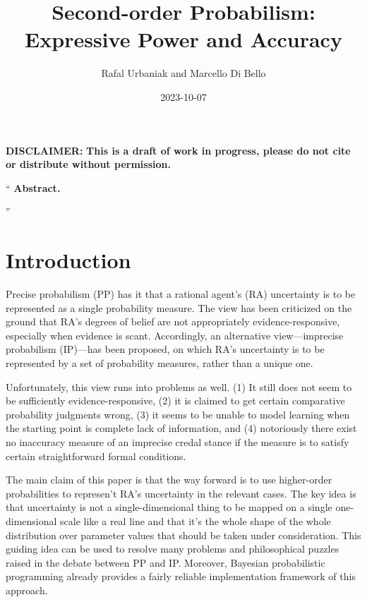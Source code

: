 \documentclass[
  10pt,
  dvipsnames,enabledeprecatedfontcommands]{scrartcl}
\title{Second-order Probabilism: Expressive Power and Accuracy}
\author{Rafal Urbaniak and Marcello Di Bello}
\date{2023-10-07}
\renewenvironment{quote}
{\list{}{\leftmargin=1em\rightmargin=1em}\item[]``}
{''\endlist}
\begin{document}
\maketitle

{
\hypersetup{linkcolor=}
\setcounter{tocdepth}{2}
\tableofcontents
}
\vspace{2cm}

\noindent \textbf{DISCLAIMER:}
\textbf{This is a draft of work in progress, please do not cite or distribute without permission.}

\thispagestyle{empty}

\newpage

\begin{quote} \textbf{Abstract.}  

\end{quote}

\hypertarget{introduction}{%
\section{Introduction}\label{introduction}}

\label{sec:introduction}

Precise probabilism (PP) has it that a rational agent's (RA) uncertainty
is to be represented as a single probability measure. The view has been
criticized on the ground that RA's degrees of belief are not
appropriately evidence-responsive, especially when evidence is scant.
Accordingly, an alternative view---imprecise probabilism (IP)---has been
proposed, on which RA's uncertainty is to be represented by a set of
probability measures, rather than a unique one.

Unfortunately, this view runs into problems as well. (1) It still does
not seem to be sufficiently evidence-responsive, (2) it is claimed to
get certain comparative probability judgments wrong, (3) it seems to be
unable to model learning when the starting point is complete lack of
information, and (4) notoriously there exist no inaccuracy measure of an
imprecise credal stance if the measure is to satisfy certain
straightforward formal conditions.


The main claim of this paper is that the way forward is to use
higher-order probabilities to represen't RA's uncertainty in the
relevant cases. The key idea is that uncertainty is not a
single-dimensional thing to be mapped on a single one-dimensional scale
like a real line and that it's the whole shape of the whole distribution
over parameter values that should be taken under consideration. This
guiding idea can be used to resolve many problems and philosophical
puzzles raised in the debate between PP and IP. Moreover, Bayesian
probabilistic programming already provides a fairly reliable
implementation framework of this approach.
\end{document}
